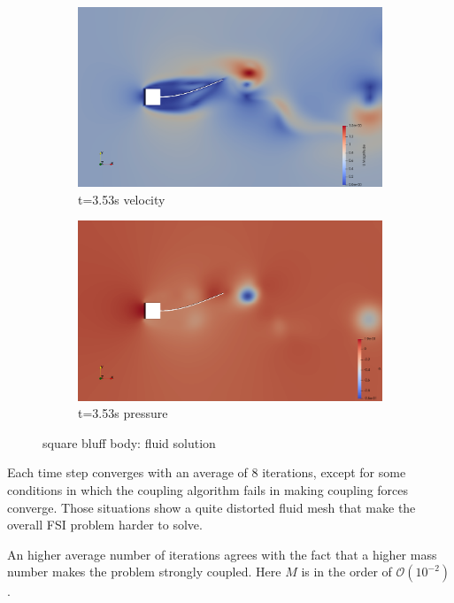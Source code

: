 \begin{figure}[htb]
\begin{subfigure}{0.5\textwidth}
  \includegraphics[width=\linewidth]{images/sq-cyl/sq_v3.png}
  \caption{t=3.53s velocity}
  \label{fig:sq_v3}
\end{subfigure}\hfil %
\begin{subfigure}{0.5\textwidth}
  \includegraphics[width=\linewidth]{images/sq-cyl/sq_p3.png}
  \caption{t=3.53s pressure}
  \label{fig:sq_p3}
\end{subfigure}\hfil %

\caption{square bluff body: fluid solution}
\label{fig:sq_sol}
\end{figure}


Each time step converges with an average of 8 iterations, except for some conditions in which the coupling algorithm fails in making coupling forces converge. Those situations show a quite distorted fluid mesh that make the overall FSI problem harder to solve.

An higher average number of iterations agrees with the fact that a higher mass number makes the problem strongly coupled. Here $M$ is in the order of $\mathcal{O} \left(10^{-2} \right) $.

